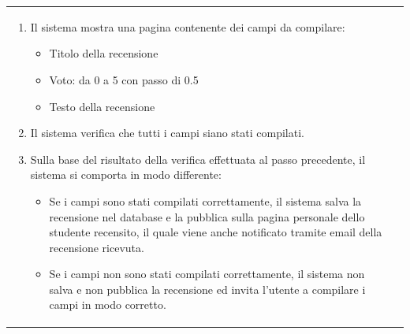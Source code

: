 \documentclass[10pt,a4paper]{report}
\begin{document}
\begin{tabular}{lp{}}
\begin{enumerate}
			\item Il sistema mostra una pagina contenente dei campi da compilare:
			\begin{itemize}
				\item Titolo della recensione
				\item Voto: da 0 a 5 con passo di 0.5
				\item Testo della recensione
			\end{itemize}
			\item Il sistema verifica che tutti i campi siano stati compilati.
			\item Sulla base del risultato della verifica effettuata al passo precedente, il sistema si comporta in modo differente:
			\begin{itemize}
				\item Se i campi sono stati compilati correttamente, il sistema salva la recensione nel database e la pubblica sulla pagina personale dello studente recensito, il quale viene anche notificato tramite email della recensione ricevuta.
				\item Se i campi non sono stati compilati correttamente, il sistema non salva e non pubblica la recensione ed invita l'utente a compilare i campi in modo corretto.
			\end{itemize}
		\end{enumerate}
	\end{tabular}
\end{document}
